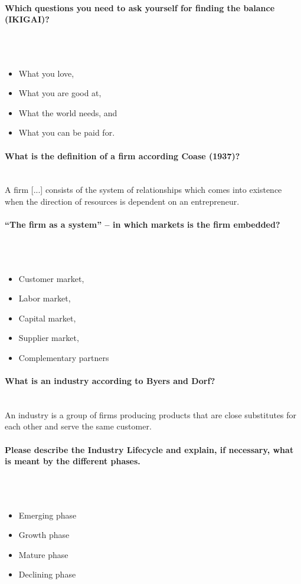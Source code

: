 \documentclass[10pt,a4paper,noendnumber=true]{scrartcl}
\newcommand{\properparagraph}[1]{\paragraph{\textcolor{Emerald}{#1}}\mbox{}\\}
\begin{document}
\properparagraph{Which questions you need to ask yourself for finding the balance (IKIGAI)?}
\\[-6ex]
\begin{itemize}
	\item What you love,
	\item What you are good at,
	\item What the world needs, and
	\item What you can be paid for.
\end{itemize}

\properparagraph{What is the definition of a firm according Coase (1937)?}
A firm [...] consists of the system of relationships which comes into existence when the direction of resources is dependent on an entrepreneur.

\properparagraph{“The firm as a system” – in which markets is the firm embedded?}
\\[-6ex]
\begin{itemize}
	\item Customer market,
	\item Labor market,
	\item Capital market,
	\item Supplier market,
	\item Complementary partners
\end{itemize}

\properparagraph{What is an industry according to Byers and Dorf?}
An industry is a group of firms producing products that are close substitutes for each other and serve the same customer.

\properparagraph{Please describe the Industry Lifecycle and explain, if necessary, what is meant by the different phases.}
\\[-6ex]
\begin{itemize}
	\item Emerging phase
	\item Growth phase
	\item Mature phase
	\item Declining phase
\end{itemize}
\end{document}
